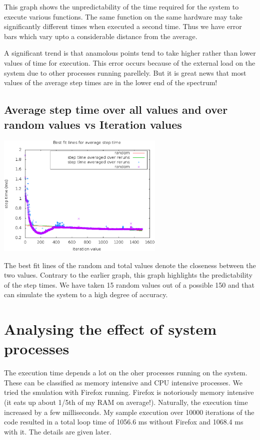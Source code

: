 \documentclass[a4paper,11pt]{article}
\begin{document}
This graph shows the unpredictability of the time required for the system to execute various functions. The same function on the same hardware may take significantly different times when executed a second time. Thus we have error bars which vary upto a considerable distance from the average.

A significant trend is that anamolous points tend to take higher rather than lower values of time for execution. This error occurs because of the external load on the system due to other processes running parellely. But it is great news that most values of the average step times are in the lower end of the spectrum!

\subsection{Average step time over all values and over random values vs Iteration values}

\begin{center}
\includegraphics[width=0.6\textwidth]{plots/g05_plot05.eps} 
\end{center}

The best fit lines of the random and total values denote the closeness between the two values. Contrary to the earlier graph, this graph highlights the predictability of the step times. We have taken 15 random values out of a possible 150 and that can simulate the system to a high degree of accuracy.

\section{Analysing the effect of system processes}

The execution time depends a lot on the oher processes running on the system. These can be classified as memory intensive and CPU intensive processes. We tried the smulation with Firefox running. Firefox is notoriously memory intensive (it eats up about 1/5th of my RAM on average!). Naturally, the execution time increased by a few milliseconds. 
My sample execution over 10000 iterations of the code resulted in a total loop time of 1056.6 ms without Firefox and 1068.4 ms with it. The details are given later.
\end{document}
